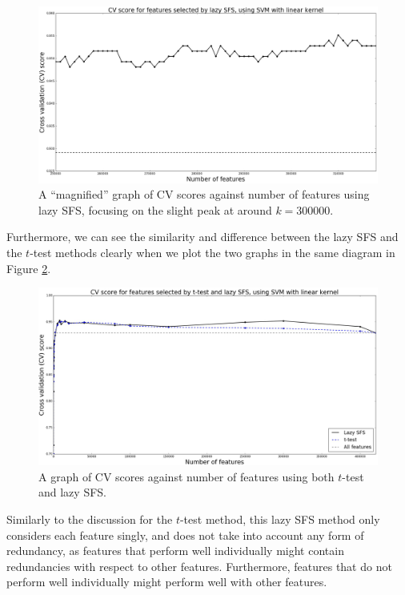 \documentclass[12pt, twoside, a4paper]{report}
\begin{document}
\begin{figure}
\centering
\includegraphics[width=\textwidth]{images/lazy_sfs_smaller_range.jpeg}
\caption{A ``magnified'' graph of CV scores against number of features using lazy SFS, focusing on the slight peak at around $k=300000$.}
\label{body:lazy_sfs_smaller_range:graph}
\end{figure}

Furthermore, we can see the similarity and difference between the lazy SFS and the $t$-test methods clearly when we plot the two graphs in the same diagram in Figure \ref{body:t_test_and_lazy_sfs:graph}.

\begin{figure}
\centering
\includegraphics[width=\textwidth]{images/t_test_and_lazy_sfs.jpeg}
\caption{A graph of CV scores against number of features using both $t$-test and lazy SFS.}
\label{body:t_test_and_lazy_sfs:graph}
\end{figure}

Similarly to the discussion for the $t$-test method, this lazy SFS method only considers each feature singly, and does not take into account any form of redundancy, as features that perform well individually might contain redundancies with respect to other features. Furthermore, features that do not perform well individually might perform well with other features.
\end{document}
